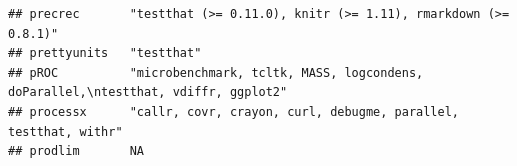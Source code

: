 \documentclass[]{article}
\begin{document}
\begin{verbatim}
## precrec       "testthat (>= 0.11.0), knitr (>= 1.11), rmarkdown (>= 0.8.1)"                                                                                                                                                                                                                                                                                                                                                                                                                                                                                                                             
## prettyunits   "testthat"                                                                                                                                                                                                                                                                                                                                                                                                                                                                                                                                                                                
## pROC          "microbenchmark, tcltk, MASS, logcondens, doParallel,\ntestthat, vdiffr, ggplot2"                                                                                                                                                                                                                                                                                                                                                                                                                                                                                                         
## processx      "callr, covr, crayon, curl, debugme, parallel, testthat, withr"                                                                                                                                                                                                                                                                                                                                                                                                                                                                                                                           
## prodlim       NA                                                                                                                                                                                                                                                                                                                                                                                                                                                                                                                                                                                        

\end{verbatim}
\end{document}
